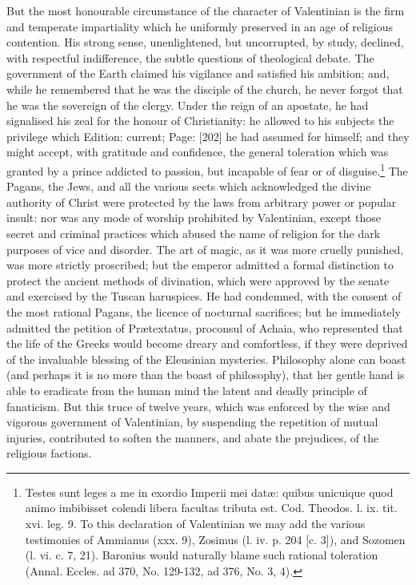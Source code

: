 But the most honourable circumstance of the character of Valentinian is the firm and temperate impartiality which he uniformly preserved in an age of religious contention. His strong sense, unenlightened, but uncorrupted, by study, declined, with respectful indifference, the subtle questions of theological debate. The government of the Earth claimed his vigilance and satisfied his ambition; and, while he remembered that he was the disciple of the church, he never forgot that he was the sovereign of the clergy. Under the reign of an apostate, he had signalised his zeal for the honour of Christianity: he allowed to his subjects the privilege which Edition: current; Page: [202] he had assumed for himself; and they might accept, with gratitude and confidence, the general toleration which was granted by a prince addicted to passion, but incapable of fear or of disguise.\footnote{Testes sunt leges a me in exordio Imperii mei datæ: quibus unicuique quod animo imbibisset colendi libera facultas tributa est. Cod. Theodos. l. ix. tit. xvi. leg. 9. To this declaration of Valentinian we may add the various testimonies of Ammianus (xxx. 9), Zosimus (l. iv. p. 204 [c. 3]), and Sozomen (l. vi. c. 7, 21). Baronius would naturally blame such rational toleration (Annal. Eccles. ad 370, No. 129-132, ad 376, No. 3, 4).} The Pagans, the Jews, and all the various sects which acknowledged the divine authority of Christ were protected by the laws from arbitrary power or popular insult: nor was any mode of worship prohibited by Valentinian, except those secret and criminal practices which abused the name of religion for the dark purposes of vice and disorder. The art of magic, as it was more cruelly punished, was more strictly proscribed; but the emperor admitted a formal distinction to protect the ancient methods of divination, which were approved by the senate and exercised by the Tuscan haruspices. He had condemned, with the consent of the most rational Pagans, the licence of nocturnal sacrifices; but he immediately admitted the petition of Prætextatus, proconsul of Achaia, who represented that the life of the Greeks would become dreary and comfortless, if they were deprived of the invaluable blessing of the Eleusinian mysteries. Philosophy alone can boast (and perhaps it is no more than the boast of philosophy), that her gentle hand is able to eradicate from the human mind the latent and deadly principle of fanaticism. But this truce of twelve years, which was enforced by the wise and vigorous government of Valentinian, by suspending the repetition of mutual injuries, contributed to soften the manners, and abate the prejudices, of the religious factions.

